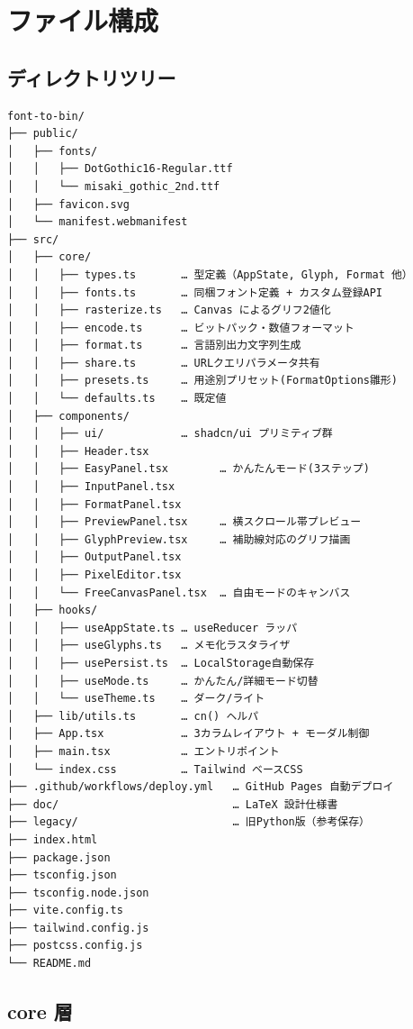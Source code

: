 \section{ファイル構成}

\subsection{ディレクトリツリー}

\begin{lstlisting}[basicstyle=\ttfamily\footnotesize,language={},numbers=none]
font-to-bin/
├── public/
│   ├── fonts/
│   │   ├── DotGothic16-Regular.ttf
│   │   └── misaki_gothic_2nd.ttf
│   ├── favicon.svg
│   └── manifest.webmanifest
├── src/
│   ├── core/
│   │   ├── types.ts       … 型定義（AppState, Glyph, Format 他）
│   │   ├── fonts.ts       … 同梱フォント定義 + カスタム登録API
│   │   ├── rasterize.ts   … Canvas によるグリフ2値化
│   │   ├── encode.ts      … ビットパック・数値フォーマット
│   │   ├── format.ts      … 言語別出力文字列生成
│   │   ├── share.ts       … URLクエリパラメータ共有
│   │   ├── presets.ts     … 用途別プリセット(FormatOptions雛形)
│   │   └── defaults.ts    … 既定値
│   ├── components/
│   │   ├── ui/            … shadcn/ui プリミティブ群
│   │   ├── Header.tsx
│   │   ├── EasyPanel.tsx        … かんたんモード(3ステップ)
│   │   ├── InputPanel.tsx
│   │   ├── FormatPanel.tsx
│   │   ├── PreviewPanel.tsx     … 横スクロール帯プレビュー
│   │   ├── GlyphPreview.tsx     … 補助線対応のグリフ描画
│   │   ├── OutputPanel.tsx
│   │   ├── PixelEditor.tsx
│   │   └── FreeCanvasPanel.tsx  … 自由モードのキャンバス
│   ├── hooks/
│   │   ├── useAppState.ts … useReducer ラッパ
│   │   ├── useGlyphs.ts   … メモ化ラスタライザ
│   │   ├── usePersist.ts  … LocalStorage自動保存
│   │   ├── useMode.ts     … かんたん/詳細モード切替
│   │   └── useTheme.ts    … ダーク/ライト
│   ├── lib/utils.ts       … cn() ヘルパ
│   ├── App.tsx            … 3カラムレイアウト + モーダル制御
│   ├── main.tsx           … エントリポイント
│   └── index.css          … Tailwind ベースCSS
├── .github/workflows/deploy.yml   … GitHub Pages 自動デプロイ
├── doc/                           … LaTeX 設計仕様書
├── legacy/                        … 旧Python版（参考保存）
├── index.html
├── package.json
├── tsconfig.json
├── tsconfig.node.json
├── vite.config.ts
├── tailwind.config.js
├── postcss.config.js
└── README.md
\end{lstlisting}

\subsection{core 層}

